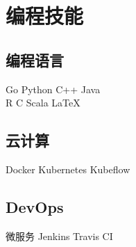 \documentclass[]{deedy-resume-openfont}
\begin{document}
\newpage
\pagestyle{fancy}
\fancyhf{}


\begin{minipage}[t]{0.3\textwidth}


\section{编程技能}
\sectionsep
\subsection{编程语言}
Go \textbullet{} Python \textbullet{} C++ \textbullet{} Java \\
R \textbullet{} C \textbullet{} Scala \textbullet{} \LaTeX\ \\
\sectionsep

\subsection{云计算}
Docker \textbullet{} Kubernetes \textbullet{} Kubeflow \\
\sectionsep

\subsection{DevOps}
微服务 \textbullet{} Jenkins \textbullet{} Travis CI  \\
\sectionsep

\end{minipage}
\hfill
\end{document}
